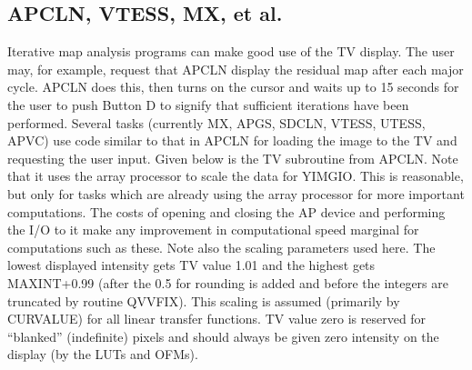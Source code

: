 \subsection{APCLN, VTESS, MX, et al.}

Iterative map analysis programs can make good use of the TV display.
The user may, for example, request that APCLN display
the residual map after each major cycle.  APCLN does this,
then turns
on the cursor and waits up to 15 seconds for the user to push Button D
to signify that sufficient iterations have been performed.  Several
tasks (currently MX, APGS, SDCLN, VTESS, UTESS, APVC) use code
similar to that in APCLN for loading the image to the TV and
requesting the user input. Given below is the TV subroutine from
APCLN.  Note that it uses the array processor to scale the data for
YIMGIO.  This is reasonable, but only for tasks which are already
using the array processor for more important computations.  The costs
of opening and closing the AP device and performing the I/O to it make
any improvement in computational speed marginal for computations such
as these.  Note also the scaling parameters used here.  The lowest
displayed intensity gets TV value 1.01 and the highest gets
MAXINT+0.99 (after the 0.5 for rounding is added and before the
integers are truncated by routine QVVFIX).  This scaling is assumed
(primarily by CURVALUE) for all linear transfer functions.  TV value
zero is reserved for ``blanked'' (indefinite) pixels and should always
be given zero intensity on the display (by the LUTs and OFMs).

